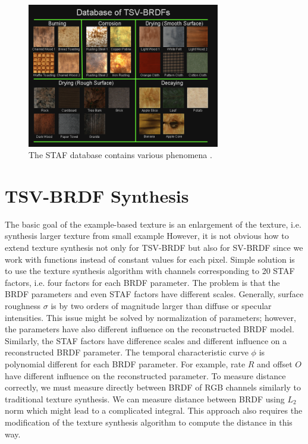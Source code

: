 \documentclass[11pt]{article}
\begin{document}
\begin{figure}[htb] 
\begin{center}
\includegraphics[width=0.75\textwidth]{figures/database}
\end{center}
\caption{The STAF database contains various phenomena \cite{Gu2006}.}
\label{Fig:Database}
\end{figure}

\section{TSV-BRDF Synthesis}
The basic goal of the example-based texture is an enlargement of the texture, i.e. synthesis larger texture from small example However, it is not obvious how to extend texture synthesis not only for TSV-BRDF but also for SV-BRDF since we work with functions instead of constant values for each pixel. Simple solution is to use the texture synthesis algorithm with channels corresponding to 20 STAF factors, i.e. four factors for each BRDF parameter. The problem is that the BRDF parameters and even STAF factors have different scales. Generally, surface roughness $\sigma$ is by two orders of magnitude larger than diffuse or specular intensities. This issue might be solved by normalization of parameters; however, the parameters have also different influence on the reconstructed BRDF model. Similarly, the STAF factors have difference scales and different influence on a reconstructed BRDF parameter. The temporal characteristic curve $\phi$ is polynomial different for each BRDF parameter. For example, rate $R$ and offset $O$ have different influence on the reconstructed parameter. To measure distance correctly, we must measure directly between BRDF of RGB channels similarly to traditional texture synthesis. We can measure distance between BRDF using $L_2$ norm which might lead to a complicated integral. This approach also requires the modification of the texture synthesis algorithm to compute the distance in this way. 
\end{document}
